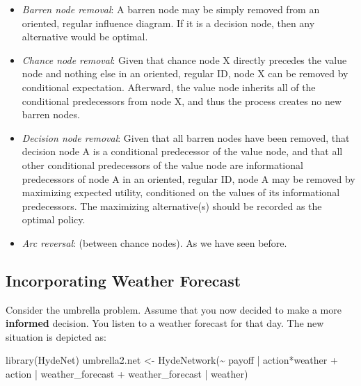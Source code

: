 \documentclass[
]{article}
\newenvironment{Shaded}{\begin{snugshade}}{\end{snugshade}}
\newcommand{\FunctionTok}[1]{\textcolor[rgb]{0.00,0.00,0.00}{#1}}
\newcommand{\NormalTok}[1]{#1}
\newcommand{\OtherTok}[1]{\textcolor[rgb]{0.56,0.35,0.01}{#1}}
\newcommand{\SpecialCharTok}[1]{\textcolor[rgb]{0.00,0.00,0.00}{#1}}
\providecommand{\tightlist}{%
  \setlength{\itemsep}{0pt}\setlength{\parskip}{0pt}}
\begin{document}
\begin{itemize}
\tightlist
\item
  \emph{Barren node removal}: A barren node may be simply removed from an oriented, regular influence diagram. If it is a decision node, then any alternative would be optimal.
\item
  \emph{Chance node removal}: Given that chance node X directly precedes the value node and nothing else in an oriented, regular ID, node X can be removed by conditional expectation. Afterward, the value node inherits all of the conditional predecessors from node X, and thus the process creates no new barren nodes.
\item
  \emph{Decision node removal}: Given that all barren nodes have been removed, that decision node A is a conditional predecessor of the value node, and that all other conditional predecessors of the value node are informational predecessors of node A in an oriented, regular ID, node A may be removed by maximizing expected utility, conditioned on the values of its informational predecessors. The maximizing alternative(s) should be recorded as the optimal policy.
\item
  \emph{Arc reversal}: (between chance nodes). As we have seen before.
\end{itemize}

\hypertarget{incorporating-weather-forecast}{%
\subsection{Incorporating Weather Forecast}\label{incorporating-weather-forecast}}

Consider the umbrella problem. Assume that you now decided to make a more \textbf{informed} decision. You listen to a weather forecast for that day. The new situation is depicted as:

\begin{Shaded}
\begin{Highlighting}[]
\FunctionTok{library}\NormalTok{(HydeNet)}
\NormalTok{umbrella2.net }\OtherTok{\textless{}{-}} \FunctionTok{HydeNetwork}\NormalTok{(}\SpecialCharTok{\textasciitilde{}}\NormalTok{ payoff }\SpecialCharTok{|}\NormalTok{ action}\SpecialCharTok{*}\NormalTok{weather}
                             \SpecialCharTok{+}\NormalTok{ action }\SpecialCharTok{|}\NormalTok{ weather\_forecast}
                             \SpecialCharTok{+}\NormalTok{ weather\_forecast }\SpecialCharTok{|}\NormalTok{ weather)}
\end{Highlighting}
\end{Shaded}
\end{document}
